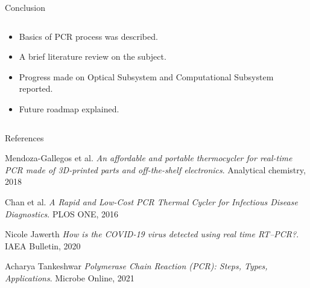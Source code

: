 \documentclass[UKenglish, aspectratio = 169]{beamer}
\begin{document}
\begin{frame}{Conclusion}
	\begin{columns}
		\begin{column}[T]{0.8\textwidth}
			\vspace*{4ex}
			\begin{itemize}
				\item Basics of PCR process was described.
				\item A brief literature review on the subject.
				\item Progress made on Optical Subsystem and Computational Subsystem reported.
				\item Future roadmap explained.
			\end{itemize}
		\end{column}
		\begin{column}{0.2\textwidth}
		\end{column}
	\end{columns}
\end{frame}

\begin{frame}[allowframebreaks]{References}

    \begin{thebibliography}{}

        Mendoza-Gallegos et al.
        \newblock \emph{An affordable and portable thermocycler for real-time PCR made of 3D-printed parts and off-the-shelf electronics}.
        \newblock  Analytical chemistry, 2018
        
        Chan et al.
        \newblock \emph{A Rapid and Low-Cost PCR Thermal Cycler for Infectious Disease Diagnostics}.
        \newblock   PLOS ONE, 2016
        
        Nicole Jawerth
        \newblock \emph{How is the COVID-19 virus detected using real time RT–PCR?}.
        \newblock   IAEA Bulletin, 2020
        
        Acharya Tankeshwar
        \newblock \emph{Polymerase Chain Reaction (PCR):  Steps, Types, Applications}.
        \newblock   Microbe Online, 2021

    \end{thebibliography}
\end{frame}
\end{document}
